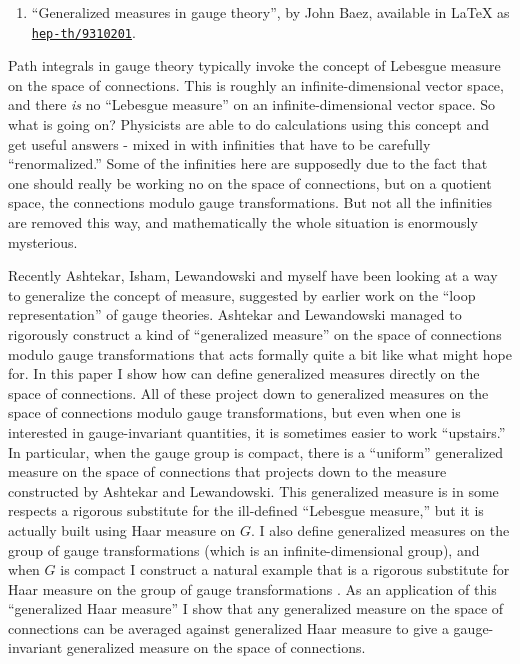 \documentclass{article}
\def\tightlist{}
\begin{document}
\begin{enumerate}
\def\labelenumi{\arabic{enumi})}
\setcounter{enumi}{4}
\tightlist
\item
  ``Generalized measures in gauge theory'', by John Baez, available in
  LaTeX as
  \href{http://xxx.lanl.gov/abs/hep-th/9310201}{\texttt{hep-th/9310201}}.
\end{enumerate}

Path integrals in gauge theory typically invoke the concept of Lebesgue
measure on the space of connections. This is roughly an
infinite-dimensional vector space, and there \emph{is} no ``Lebesgue
measure'' on an infinite-dimensional vector space. So what is going on?
Physicists are able to do calculations using this concept and get useful
answers - mixed in with infinities that have to be carefully
``renormalized.'' Some of the infinities here are supposedly due to the
fact that one should really be working no on the space of connections,
but on a quotient space, the connections modulo gauge transformations.
But not all the infinities are removed this way, and mathematically the
whole situation is enormously mysterious.

Recently Ashtekar, Isham, Lewandowski and myself have been looking at a
way to generalize the concept of measure, suggested by earlier work on
the ``loop representation'' of gauge theories. Ashtekar and Lewandowski
managed to rigorously construct a kind of ``generalized measure'' on the
space of connections modulo gauge transformations that acts formally
quite a bit like what might hope for. In this paper I show how can
define generalized measures directly on the space of connections. All of
these project down to generalized measures on the space of connections
modulo gauge transformations, but even when one is interested in
gauge-invariant quantities, it is sometimes easier to work ``upstairs.''
In particular, when the gauge group is compact, there is a ``uniform''
generalized measure on the space of connections that projects down to
the measure constructed by Ashtekar and Lewandowski. This generalized
measure is in some respects a rigorous substitute for the ill-defined
``Lebesgue measure,'' but it is actually built using Haar measure on
\(G\). I also define generalized measures on the group of gauge
transformations (which is an infinite-dimensional group), and when \(G\)
is compact I construct a natural example that is a rigorous substitute
for Haar measure on the group of gauge transformations . As an
application of this ``generalized Haar measure'' I show that any
generalized measure on the space of connections can be averaged against
generalized Haar measure to give a gauge-invariant generalized measure
on the space of connections.
\end{document}

